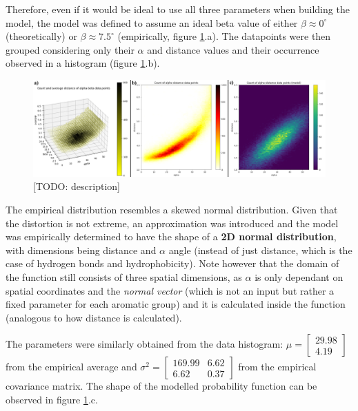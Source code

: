       Therefore, even if it would be ideal to use all three parameters when building the model, the model was defined to assume an ideal beta value of either $\beta \approx 0^{\circ}$ (theoretically) or $\beta \approx 7.5^{\circ}$ (empirically, figure \ref{fig:results/stacking_modeling}.a). The datapoints were then grouped considering only their $\alpha$ and distance values and their occurrence observed in a histogram (figure \ref{fig:results/stacking_modeling}.b).

      \begin{figure}[H]
        \centering
        \includegraphics[width=1\textwidth]{figures/results/stacking_modeling.png}
        \caption{\label{fig:results/stacking_modeling} [TODO: description]}
      \end{figure}

      The empirical distribution resembles a skewed normal distribution. Given that the distortion is not extreme, an approximation was introduced and the model was empirically determined to have the shape of a \textbf{2D normal distribution}, with dimensions being distance and $\alpha$ angle (instead of just distance, which is the case of hydrogen bonds and hydrophobicity). Note however that the domain of the function still consists of three spatial dimensions, as $\alpha$ is only dependant on spatial coordinates and the \textit{normal vector} (which is not an input but rather a fixed parameter for each aromatic group) and it is calculated inside the function (analogous to how distance is calculated).

      The parameters were similarly obtained from the data histogram: $\mu = \begin{bmatrix} 29.98 \\ 4.19 \end{bmatrix}$ from the empirical average and $\sigma^2 = \begin{bmatrix} 169.99 & 6.62 \\ 6.62 & 0.37 \end{bmatrix}$ from the empirical covariance matrix. The shape of the modelled probability function can be observed in figure \ref{fig:results/stacking_modeling}.c.

